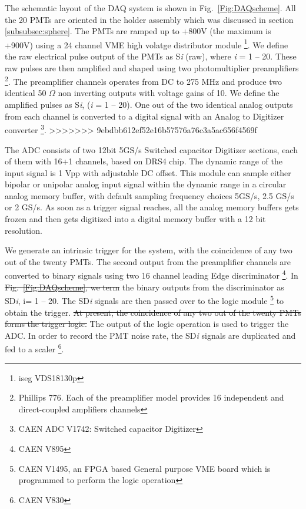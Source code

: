 The schematic layout 
of the DAQ system is shown in Fig.~{\ref{Fig:DAQscheme}}. All the 20 PMTs 
are oriented in the holder assembly which was discussed in section \ref{subsubsec:sphere}. 
The PMTs are ramped up to +800V (the maximum is +900V) using a 24 channel 
VME high volatge distributor module \footnote{iseg VDS18130p}.  
We define the raw electrical pulse output of the PMTs as S{\it i} (raw), where {\it i} = 1 -- 20. 
These raw pulses are then 
amplified and shaped using two photomultiplier preamplifiers \footnote{Phillips 776. 
Each of the preamplifier model provides 16 independent  and direct-coupled 
amplifiers channels}. The preamplifier channels operates from DC to 275 MHz and 
produce two identical 50 $\Omega$ non inverting outputs with voltage gains of 10. 
We define the amplified pulses as S{\it i}, ({\it i} = 1 -- 20). One out of the 
two identical analog outputs from each channel is converted to a digital 
signal with an Analog to Digitizer converter \footnote{CAEN ADC V1742: Switched capacitor Digitizer}. 
>>>>>>> 9ebdbb612ef52e16b57576a76c3a5ac656f4569f

The ADC consists of two 12bit 5GS/s Switched capacitor Digitizer sections, 
each of them with 16+1 channels, based on DRS4 chip. The dynamic range of the input signal is 1 Vpp with adjustable DC offset. This module can sample either bipolar or unipolar analog input signal within the dynamic range in a circular 
analog memory buffer, with default sampling frequency choices 5GS/s, 2.5 GS/s 
or 2 GS/s. As soon as a trigger signal reaches, all the analog memory 
buffers gets frozen and then gets digitized into a digital memory buffer 
with a 12 bit resolution. 

 We generate an intrinsic trigger for the system, with the coincidence of any two out of the twenty PMTs. The second output from the preamplifier channels are converted to binary signals using two 16 channel leading Edge discriminator \footnote{CAEN V895}. In \sout{Fig.~\ref{Fig:DAQscheme}, we term} the binary outputs from the discriminator  as SD{\it i}, i= 1 -- 20. The SD{\it i} signals are then passed over to the logic module \footnote{CAEN V1495, an FPGA based General purpose VME board which is programmed to perform the 
logic operation} to obtain the trigger.  \sout{At present, the coincidence of any two out of the twenty PMTs forms the trigger logic.} The output of the logic operation is 
used to trigger the ADC. In order to record the PMT noise rate, the 
SD{\it i} signals are duplicated and fed to a scaler \footnote{CAEN V830}.




